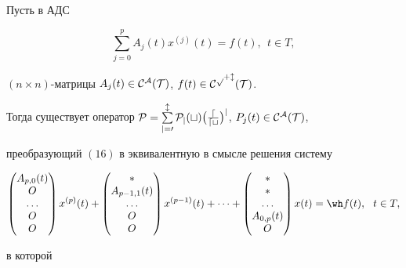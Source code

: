 \begin{lem}


Пусть в АДС


\begin{equation}


\sum_{j=0}^{p}{A_j(t)x^{(j)}(t)}=f(t), \ \ t \in T,


\end{equation}


$(n \times n)$-матрицы $A_j(t) \in \cal C^A(T)$, $f(t) \in \cal C^{p+l}(T)$.





Тогда существует оператор $\cal P=\sum\limits_{j=0}^{l}{P_j(t)


\big(\frac{d}{dt} \big)^j }$, $P_j(t) \in \cal C^A(T)$, 


преобразующий $(16)$ в эквивалентную в смысле решения систему


\begin{equation}


\begin{pmatrix}


A_{p,0}(t) \\ O \\ \dotsc \\ O \\ O 


\end{pmatrix} x^{(p)}(t)+


\begin{pmatrix}


\ast \\ A_{p-1,1}(t) \\ \dotsc \\ O \\ O 


\end{pmatrix}x^{(p-1)}(t)+\dotsb +


\begin{pmatrix}


\ast \\ \ast \\ \dotsc \\ A_{0,p}(t) \\ O 


\end{pmatrix}


x(t)=\wh f(t), \ \ t \in T,


\end{equation}


в которой



\end{lem}
